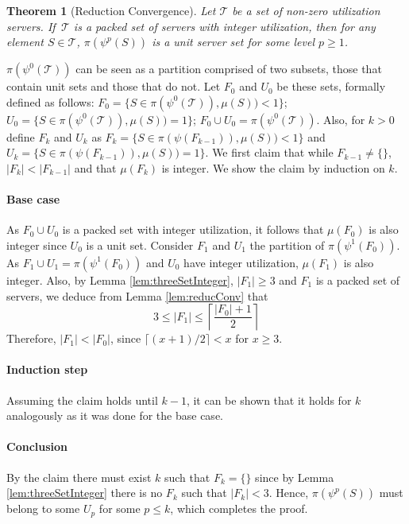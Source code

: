 \documentclass[twocolumn, compsocconf]{IEEEtran}
\newtheorem{theorem}{Theorem}[section]
\renewcommand{\leq}{\leqslant}
\renewcommand{\geq}{\geqslant}
\newcommand{\reduc}{\ensuremath{\psi}}\newcommand{\reducMap}{\ensuremath{\psi}}\newcommand{\util}{\ensuremath{\mu}\xspace}
\newcommand{\pack}{\ensuremath{\pi}}
\newcommand{\servSet}{\ensuremath{\mathcal{T}}}
\newcounter{step}
\begin{document}
\begin{theorem}[Reduction Convergence]\label{thm:reducConv}
  Let $\servSet$ be a set of non-zero utilization servers.  If $\,\servSet$ is a
  packed set of servers with integer utilization, then for any element $S \in
  \servSet$, $\pack(\reduc^p(S))$ is a unit server set for some level $p \geq
  1$.
\end{theorem}

\begin{IEEEproof}
  $\pack(\reduc^0(\servSet))$ can be seen as a partition comprised of two
  subsets, those that contain unit sets and those that do not.  Let $F_{0}$ and
  $U_{0}$ be these sets, formally defined as follows: $F_0 = \{S \in
  \pack(\reduc^0(\servSet)), \util(S)) < 1\}$; $U_0 = \{S \in
  \pack(\reduc^0(\servSet)), \util(S)) = 1\}$; $F_0 \cup U_0 =
  \pack(\reduc^0(\servSet))$.  Also, for $k>0$ define $F_k$ and $U_k$ as $F_k =
  \{S \in \pack(\reduc(F_{k-1})), \util(S)) < 1\}$ and $U_k = \{S \in
  \pack(\reduc(F_{k-1})), \util(S)) = 1\}$.  We first claim that while $F_{k-1}
  \not= \{\}$, $|F_{k}| < |F_{k-1}|$ and that $\mu(F_k)$ is integer.  We show
  the claim by induction on $k$.

  \paragraph{Base case}
  As $F_0 \cup U_0$ is a packed set with integer utilization, it follows that
  $\mu(F_0)$ is also integer since $U_0$ is a unit set.  Consider $F_1$ and
  $U_1$ the partition of $\pack(\reduc^1(F_0))$.  As $F_1 \cup U_1 =
  \pack(\reduc^1(F_0))$ and $U_0$ have integer utilization, $\mu(F_1)$ is also
  integer.  Also, by Lemma \ref{lem:threeSetInteger}, $|F_1| \geq 3$ and $F_1$
  is a packed set of servers, we deduce from Lemma \ref{lem:reducConv} that
  \[
  3 \leq |F_{1}| \leq \left \lceil \frac{|F_0| + 1}{2} \right \rceil
  \]
  Therefore, $|F_1| < |F_0|$, since $\lceil (x+1)/2 \rceil < x$ for $x \geq 3$.

  \paragraph{Induction step}
  Assuming the claim holds until $k-1$, it can be shown that it holds for $k$
  analogously as it was done for the base case.
  \paragraph{Conclusion}
  By the claim there must exist $k$ such that $F_k = \{\}$ since by Lemma
  \ref{lem:threeSetInteger} there is no $F_k$ such that $|F_k| < 3$.  Hence,
  $\pack(\reduc^{p}(S))$ must belong to some $U_{p}$ for some $p\leq k$, which
  completes the proof.
\end{IEEEproof}
  
\end{document}
